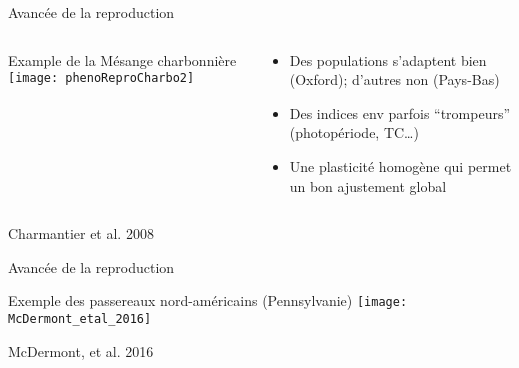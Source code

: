 \documentclass[10pt]{beamer}
\begin{document}
\begin{frame}{Avancée de la reproduction}
  \begin{columns}[c]
    \begin{column}[c]{0.6\textwidth}
      \begin{center}
        Example de la Mésange charbonnière
        \vspace{10pt}
        \texttt{[image: phenoReproCharbo2]}
      \end{center}
    \end{column}
    \begin{column}[c]{0.4\textwidth}
      \begin{itemize}
      \item Des populations s’adaptent bien (Oxford); d’autres non (Pays-Bas)
      \item Des indices env parfois ``trompeurs'' (photopériode, T\degres C…)
      \item Une plasticité homogène qui permet un bon ajustement global
      \end{itemize}
    \end{column}
  \end{columns}
  \begin{tiny}
    Charmantier et al. 2008
  \end{tiny}
\end{frame}




\begin{frame}{Avancée de la reproduction}
  \begin{center}  
   Exemple des passereaux nord-américains (Pennsylvanie)
    \vspace{10pt}
    \texttt{[image: McDermont\_etal\_2016]}
  \end{center}
  \begin{tiny}
    McDermont, et al. 2016

  \end{tiny}
\end{frame}
\end{document}
